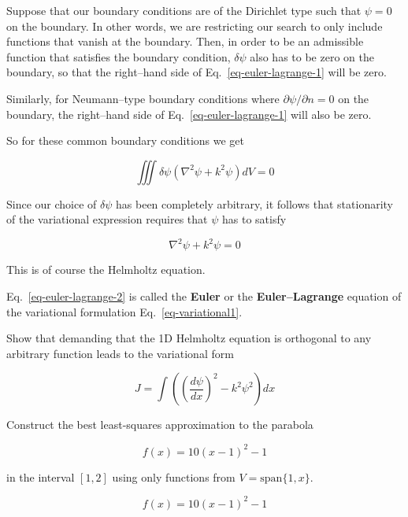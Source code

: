 Suppose that our boundary conditions are of the Dirichlet type such that $\psi=0$ on the boundary. In other words, we are restricting our search to only include functions that vanish at the boundary. Then, in order to be an admissible function that satisfies the boundary condition, $\delta \psi$ also has to be zero on the boundary, so that the right--hand side of Eq.~\ref{eq-euler-lagrange-1} will be zero.

Similarly, for Neumann--type boundary conditions where $\partial \psi / \partial n = 0$ on the boundary, the right--hand side of Eq.~\ref{eq-euler-lagrange-1} will also be zero.

So for these common boundary conditions we get

\begin{equation}
\iiint \delta \psi (\nabla^2 \psi + k^2 \psi ) dV = 0
\end{equation} 

Since our choice of $\delta \psi$ has been completely arbitrary, it follows that stationarity of the variational expression requires that $\psi$ has to satisfy

\begin{equation}
\nabla^2 \psi + k^2 \psi = 0 \label{eq-euler-lagrange-2}
\end{equation} 

This is of course the Helmholtz equation.

Eq.~\ref{eq-euler-lagrange-2} is called the \textbf{Euler} or the \textbf{Euler--Lagrange} equation of the variational formulation Eq.~\ref{eq-variational1}.


\begin{exer}
Show that demanding that the 1D Helmholtz equation is orthogonal to any arbitrary function leads to the variational form 

$$J = \int \left( \left(\frac{d \psi}{d x}\right)^2 - k^2 \psi^2 \right) dx$$

\end{exer}


\begin{exer}
  
Construct the best least-squares approximation to the parabola 

$$f(x) = 10(x-1)^2 -1$$ 

in the interval $[1,2]$ using only functions from $V = \mathrm{span} \{1, x\}$.

\begin{sol}
$$f(x) = 10(x-1)^2 -1$$   
\end{sol}
\end{exer}



